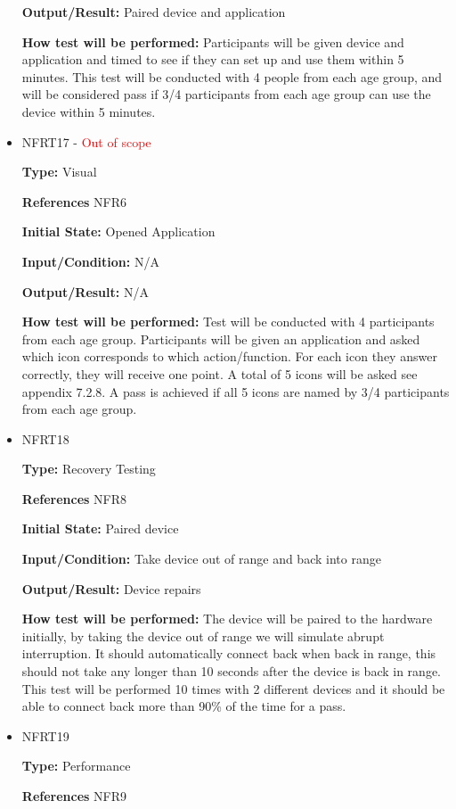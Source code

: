 \documentclass[12pt, titlepage]{article}
\begin{document}
\begin{itemize}
\textbf{Output/Result:} Paired device and application
					
\textbf{How test will be performed:} Participants will be given device and application and timed to see if they can set up and use them within 5 minutes. This test will be conducted with 4 people from each age group, and will be considered pass if 3/4 participants from each age group can use the device within 5 minutes.

\item{NFRT17 - \textcolor{red}{Out of scope}}

\textbf{Type:} Visual

\textbf{References} NFR6
					
\textbf{Initial State:} Opened Application
					
\textbf{Input/Condition:} N/A
					
\textbf{Output/Result:} N/A
					
\textbf{How test will be performed:} Test will be conducted with 4 participants from each age group. Participants will be given an application and asked which icon corresponds to which action/function. For each icon they answer correctly, they will receive one point. A total of 5 icons will be asked see appendix 7.2.8. A pass is achieved if all 5 icons are named by 3/4 participants from each age group.

\item{NFRT18}

\textbf{Type:} Recovery Testing

\textbf{References} NFR8
					
\textbf{Initial State:} Paired device
					
\textbf{Input/Condition:} Take device out of range and back into range
					
\textbf{Output/Result:} Device repairs
					
\textbf{How test will be performed:} The device will be paired to the hardware initially, by taking the device out of range we will simulate abrupt interruption. It should automatically connect back when back in range, this should not take any longer than 10 seconds after the device is back in range. This test will be performed 10 times with 2 different devices and it should be able to connect back more than 90\% of the time for a pass.

\item{NFRT19}

\textbf{Type:} Performance

\textbf{References} NFR9
					

\end{itemize}
\end{document}
